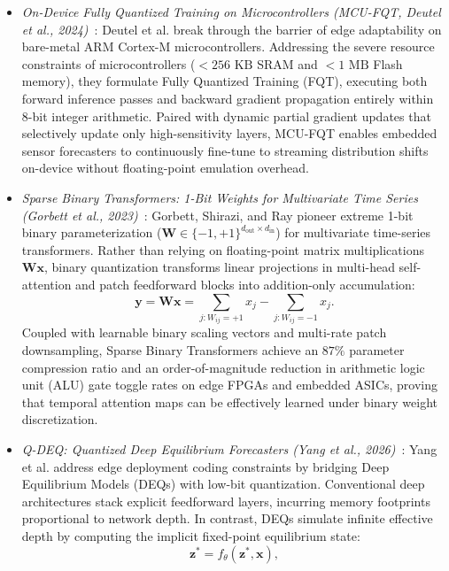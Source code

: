 \begin{itemize}[leftmargin=*]
    \item \emph{On-Device Fully Quantized Training on Microcontrollers (MCU-FQT, Deutel et al., 2024)}~\cite{deutel2024mcutraining}: Deutel et al. break through the barrier of edge adaptability on bare-metal ARM Cortex-M microcontrollers. Addressing the severe resource constraints of microcontrollers ($<256\text{ KB}$ SRAM and $<1\text{ MB}$ Flash memory), they formulate Fully Quantized Training (FQT), executing both forward inference passes and backward gradient propagation entirely within 8-bit integer arithmetic. Paired with dynamic partial gradient updates that selectively update only high-sensitivity layers, MCU-FQT enables embedded sensor forecasters to continuously fine-tune to streaming distribution shifts on-device without floating-point emulation overhead.
    \item \emph{Sparse Binary Transformers: 1-Bit Weights for Multivariate Time Series (Gorbett et al., 2023)}~\cite{gorbett2023sparsebinary}: Gorbett, Shirazi, and Ray pioneer extreme 1-bit binary parameterization ($\mathbf{W} \in \{-1, +1\}^{d_{\text{out}} \times d_{\text{in}}}$) for multivariate time-series transformers. Rather than relying on floating-point matrix multiplications $\mathbf{W}\mathbf{x}$, binary quantization transforms linear projections in multi-head self-attention and patch feedforward blocks into addition-only accumulation:
    \begin{equation}
        \mathbf{y} = \mathbf{W}\mathbf{x} = \sum_{j: W_{ij}=+1} x_j - \sum_{j: W_{ij}=-1} x_j.
    \end{equation}
    Coupled with learnable binary scaling vectors and multi-rate patch downsampling, Sparse Binary Transformers achieve an $87\%$ parameter compression ratio and an order-of-magnitude reduction in arithmetic logic unit (ALU) gate toggle rates on edge FPGAs and embedded ASICs, proving that temporal attention maps can be effectively learned under binary weight discretization.
    \item \emph{Q-DEQ: Quantized Deep Equilibrium Forecasters (Yang et al., 2026)}~\cite{yang2026qdeq}: Yang et al. address edge deployment coding constraints by bridging Deep Equilibrium Models (DEQs) with low-bit quantization. Conventional deep architectures stack explicit feedforward layers, incurring memory footprints proportional to network depth. In contrast, DEQs simulate infinite effective depth by computing the implicit fixed-point equilibrium state:
    \begin{equation}
        \mathbf{z}^* = f_\theta(\mathbf{z}^*, \mathbf{x}),

\end{equation}
\end{itemize}
